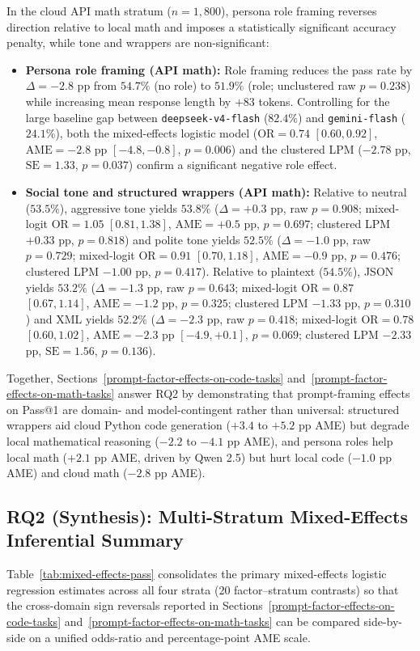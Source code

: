 \documentclass[a4paper,fleqn]{cas-sc}
\providecommand{\tightlist}{%
  \setlength{\itemsep}{0pt}\setlength{\parskip}{0pt}}
\begin{document}
In the cloud API math stratum ($n = 1,800$), persona role framing reverses direction relative to local math and imposes a statistically significant accuracy penalty, while tone and wrappers are non-significant:
\begin{itemize}
\tightlist
\item \textbf{Persona role framing (API math):} Role framing reduces the pass rate by $\Delta = -2.8$ pp from $54.7\%$ (no role) to $51.9\%$ (role; unclustered raw $p = 0.238$) while increasing mean response length by $+83$ tokens. Controlling for the large baseline gap between \texttt{deepseek-v4-flash} ($82.4\%$) and \texttt{gemini-flash} ($24.1\%$), both the mixed-effects logistic model ($\text{OR} = 0.74$ $[0.60, 0.92]$, $\text{AME} = -2.8$ pp $[-4.8, -0.8]$, $p = 0.006$) and the clustered LPM ($-2.78$ pp, $\text{SE} = 1.33$, $p = 0.037$) confirm a significant negative role effect.
\item \textbf{Social tone and structured wrappers (API math):} Relative to neutral ($53.5\%$), aggressive tone yields $53.8\%$ ($\Delta = +0.3$ pp, raw $p = 0.908$; mixed-logit $\text{OR} = 1.05$ $[0.81, 1.38]$, $\text{AME} = +0.5$ pp, $p = 0.697$; clustered LPM $+0.33$ pp, $p = 0.818$) and polite tone yields $52.5\%$ ($\Delta = -1.0$ pp, raw $p = 0.729$; mixed-logit $\text{OR} = 0.91$ $[0.70, 1.18]$, $\text{AME} = -0.9$ pp, $p = 0.476$; clustered LPM $-1.00$ pp, $p = 0.417$). Relative to plaintext ($54.5\%$), JSON yields $53.2\%$ ($\Delta = -1.3$ pp, raw $p = 0.643$; mixed-logit $\text{OR} = 0.87$ $[0.67, 1.14]$, $\text{AME} = -1.2$ pp, $p = 0.325$; clustered LPM $-1.33$ pp, $p = 0.310$) and XML yields $52.2\%$ ($\Delta = -2.3$ pp, raw $p = 0.418$; mixed-logit $\text{OR} = 0.78$ $[0.60, 1.02]$, $\text{AME} = -2.3$ pp $[-4.9, +0.1]$, $p = 0.069$; clustered LPM $-2.33$ pp, $\text{SE} = 1.56$, $p = 0.136$).
\end{itemize}

Together, Sections~\ref{prompt-factor-effects-on-code-tasks} and~\ref{prompt-factor-effects-on-math-tasks} answer RQ2 by demonstrating that prompt-framing effects on Pass@1 are domain- and model-contingent rather than universal: structured wrappers aid cloud Python code generation ($+3.4$ to $+5.2$ pp AME) but degrade local mathematical reasoning ($-2.2$ to $-4.1$ pp AME), and persona roles help local math ($+2.1$ pp AME, driven by Qwen 2.5) but hurt local code ($-1.0$ pp AME) and cloud math ($-2.8$ pp AME).

\subsection{RQ2 (Synthesis): Multi-Stratum Mixed-Effects Inferential Summary}\label{mixed-effects-inferential-results}
Table~\ref{tab:mixed-effects-pass} consolidates the primary mixed-effects logistic regression estimates across all four strata (20 factor--stratum contrasts) so that the cross-domain sign reversals reported in Sections~\ref{prompt-factor-effects-on-code-tasks} and~\ref{prompt-factor-effects-on-math-tasks} can be compared side-by-side on a unified odds-ratio and percentage-point AME scale.
\end{document}
